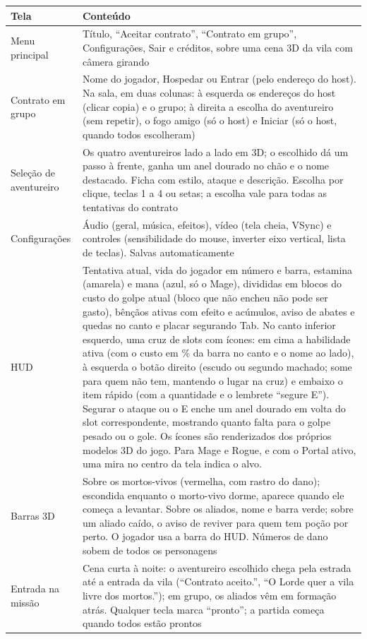 \documentclass[11pt,a4paper]{article}
\begin{document}
\begin{tabularx}{\textwidth}{@{}lX@{}}
\toprule
\textbf{Tela} & \textbf{Conteúdo} \\
\midrule
Menu principal & Título, ``Aceitar contrato'', ``Contrato em grupo'', Configurações, Sair e créditos, sobre uma cena 3D da vila com câmera girando \\
Contrato em grupo & Nome do jogador, Hospedar ou Entrar (pelo endereço do host). Na sala, em duas colunas: à esquerda os endereços do host (clicar copia) e o grupo; à direita a escolha do aventureiro (sem repetir), o fogo amigo (só o host) e Iniciar (só o host, quando todos escolheram) \\
Seleção de aventureiro & Os quatro aventureiros lado a lado em 3D; o escolhido dá um passo à frente, ganha um anel dourado no chão e o nome destacado. Ficha com estilo, ataque e descrição. Escolha por clique, teclas 1 a 4 ou setas; a escolha vale para todas as tentativas do contrato \\
Configurações & Áudio (geral, música, efeitos), vídeo (tela cheia, VSync) e controles (sensibilidade do mouse, inverter eixo vertical, lista de teclas). Salvas automaticamente \\
HUD & Tentativa atual, vida do jogador em número e barra, estamina (amarela) e mana (azul, só o Mage), divididas em blocos do custo do golpe atual (bloco que não encheu não pode ser gasto), bênçãos ativas com efeito e acúmulos, aviso de abates e quedas no canto e placar segurando Tab. No canto inferior esquerdo, uma cruz de slots com ícones: em cima a habilidade ativa (com o custo em \% da barra no canto e o nome ao lado), à esquerda o botão direito (escudo ou segundo machado; some para quem não tem, mantendo o lugar na cruz) e embaixo o item rápido (com a quantidade e o lembrete ``segure E''). Segurar o ataque ou o E enche um anel dourado em volta do slot correspondente, mostrando quanto falta para o golpe pesado ou o gole. Os ícones são renderizados dos próprios modelos 3D do jogo. Para Mage e Rogue, e com o Portal ativo, uma mira no centro da tela indica o alvo. \\
Barras 3D & Sobre os mortos-vivos (vermelha, com rastro do dano); escondida enquanto o morto-vivo dorme, aparece quando ele começa a levantar. Sobre os aliados, nome e barra verde; sobre um aliado caído, o aviso de reviver para quem tem poção por perto. O jogador usa a barra do HUD. Números de dano sobem de todos os personagens \\
Entrada na missão & Cena curta à noite: o aventureiro escolhido chega pela estrada até a entrada da vila (``Contrato aceito.'', ``O Lorde quer a vila livre dos mortos.''); em grupo, os aliados vêm em formação atrás. Qualquer tecla marca ``pronto''; a partida começa quando todos estão prontos \\

\end{tabularx}
\end{document}
